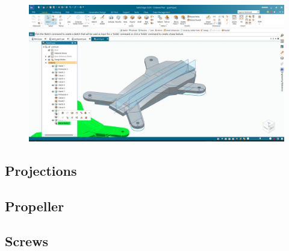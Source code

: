 \documentclass{article}
\begin{document}
\begin{figure}[H]
\centering
\includegraphics[scale = 0.3 ]{./figs/body2.jpeg}
\end{figure}
\subsection{Projections}
\subsection{Propeller}
\subsection{Screws}
\end{document}
